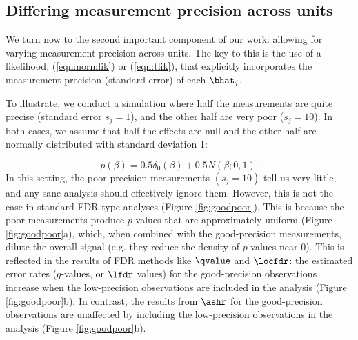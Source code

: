 \subsection*{Differing measurement precision across units}

We turn now to the second important component of our work: allowing for varying
 measurement precision across units. The key to this is the use of a likelihood,
 (\ref{eqn:normlik}) or (\ref{eqn:tlik}), that explicitly incorporates the measurement precision (standard error) of each $\bhat_j$.

To illustrate, we conduct a simulation where half the measurements are quite precise (standard error $s_j = 1$), and the other half are very poor
 ($s_j=10$).  In both cases,
we assume that half the effects are null
and the other half are normally distributed with standard deviation 1:

\begin{equation}
p(\beta) = 0.5 \delta_0(\beta) + 0.5 N(\beta; 0,1).
\end{equation}
In this setting, the poor-precision measurements $(s_j=10)$ tell us very little, and any sane analysis should effectively ignore them. 
 However, this is not the case in standard FDR-type analyses (Figure \ref{fig:goodpoor}). This is because the poor measurements 
 produce $p$ values that are approximately uniform  (Figure \ref{fig:goodpoor}a), 
 which, when combined with the good-precision measurements, dilute the overall signal (e.g. they reduce the density of $p$ values near 0).
 This is reflected in the results of FDR methods like $\qvalue$ and $\locfdr$:
the estimated error rates ($q$-values, or $\lfdr$ values) for the good-precision observations increase when the low-precision observations are included in the analysis
(Figure \ref{fig:goodpoor}b). In contrast, the results from $\ashr$ 
for the good-precision observations are unaffected by including the low-precision observations in the analysis (Figure \ref{fig:goodpoor}b).